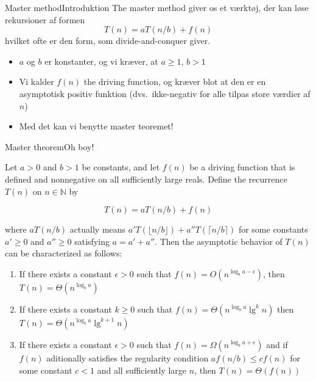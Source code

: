 \documentclass[aspectratio=1610]{beamer}
\begin{document}
\begin{frame}{Master method}{Introduktion}
    The master method giver os et værktøj, der kan løse rekursioner af formen
    \[
        T(n) = aT(n/b) + f(n)
    \] hvilket ofte er den form, som divide-and-conquer giver.

    \begin{itemize}
        \item $a$ og $b$ er konstanter, og vi kræver, at $a \geq 1$, $b > 1$
        \item Vi kalder $f(n)$ \alert{the driving function}, og kræver blot at
            den er en asymptotisk positiv funktion (dvs.\ ikke-negativ for alle
            tilpas store værdier af $n$)
        \item Med det kan vi benytte \alert{master teoremet}!
    \end{itemize}
\end{frame}

\begin{frame}{Master theorem}{Oh boy!}
    \begin{theorem}
        \small
        Let $a > 0$ and $b > 1$ be constants, and let $f(n)$ be a driving
        function that is defined and nonnegative on all sufficiently large
        reals. Define the recurrence $T(n)$ on $n \in \mathbb{N}$ by

        \[
            T(n) = aT(n/b) + f(n)
        \] 

        where $aT(n/b)$ actually means $a'T(\lfloor n/b \rfloor) + a''T(\lceil
        n/b \rceil)$ for some constants $a' \geq 0$ and $a'' \geq 0$ satisfying
        $a = a' + a''$. Then the asymptotic behavior of $T(n)$ can be
        characterized as follows:

        \begin{enumerate}
            \pause
            \item If there exists a constant $\epsilon > 0$ such that $f(n) =
                O(n^{\log_b a-\epsilon})$, then $T(n) = \Theta(n^{\log_b a})$
            \pause
            \item If there exists a constant $k \geq 0$ such that $f(n) =
                \Theta(n^{\log_b a} \lg^kn)$ then $T(n) =
                \Theta(n^{\log_ba}\lg^{k+1}n)$
            \pause
            \item If there exists a constant $\epsilon > 0$ such that $f(n) =
                \Omega(n^{\log_b a+e})$ and if $f(n)$ aditionally satisfies the
                \alert{regularity condition} $af(n/b) \leq cf(n)$ for some
                constant $c < 1$ and all sufficiently large $n$, then $T(n) =
                \Theta(f(n))$
        \end{enumerate}
    \end{theorem}
\end{frame}
\end{document}
